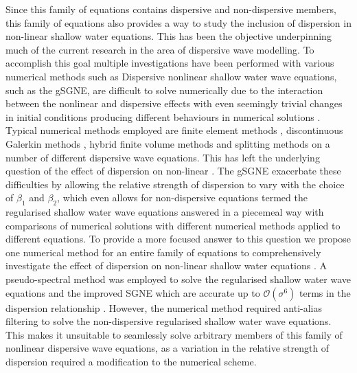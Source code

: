 \documentclass[10pt]{elsarticle}
\providecommand{\DIFaddtex}[1]{{\protect\color{blue} \sf #1}} %
\providecommand{\DIFdeltex}[1]{{\protect\color{red} \scriptsize #1}} %
\providecommand{\DIFaddbegin}{} %
\providecommand{\DIFaddend}{} %
\providecommand{\DIFdelbegin}{} %
\providecommand{\DIFdelend}{} %
\providecommand{\DIFadd}[1]{\texorpdfstring{\DIFaddtex{#1}}{#1}} %
\providecommand{\DIFdel}[1]{\texorpdfstring{\DIFdeltex{#1}}{}} %
\newcommand{\DIFscaledelfig}{0.5}
\newlength{\DIFdelgraphicswidth} %
\newlength{\DIFdelgraphicsheight} %
\newcommand{\DIFaddincludegraphics}[2][]{{\color{blue}\fbox{\DIFOincludegraphics[#1]{#2}}}} %
\newcommand{\DIFdelincludegraphics}[2][]{%
\sbox{\DIFdelgraphicsbox}{\DIFOincludegraphics[#1]{#2}}%
\settoboxwidth{\DIFdelgraphicswidth}{\DIFdelgraphicsbox} %
\settoboxtotalheight{\DIFdelgraphicsheight}{\DIFdelgraphicsbox} %
\scalebox{\DIFscaledelfig}{%
\parbox[b]{\DIFdelgraphicswidth}{\usebox{\DIFdelgraphicsbox}\\[-\baselineskip] \rule{\DIFdelgraphicswidth}{0em}}\llap{\resizebox{\DIFdelgraphicswidth}{\DIFdelgraphicsheight}{%
\setlength{\unitlength}{\DIFdelgraphicswidth}%
\begin{picture}(1,1)%
\thicklines\linethickness{2pt} %
{\color[rgb]{1,0,0}\put(0,0){\framebox(1,1){}}}%
{\color[rgb]{1,0,0}\put(0,0){\line( 1,1){1}}}%
{\color[rgb]{1,0,0}\put(0,1){\line(1,-1){1}}}%
\end{picture}%
}\hspace*{3pt}}} %
} %
\DeclareRobustCommand{\DIFaddbegin}{\DIFOaddbegin \let\includegraphics\DIFaddincludegraphics} %
\DeclareRobustCommand{\DIFaddend}{\DIFOaddend \let\includegraphics\DIFOincludegraphics} %
\DeclareRobustCommand{\DIFdelbegin}{\DIFOdelbegin \let\includegraphics\DIFdelincludegraphics} %
\DeclareRobustCommand{\DIFdelend}{\DIFOaddend \let\includegraphics\DIFOincludegraphics} %
\begin{document}
\DIFdelbegin \DIFdel{Since this family of equations contains dispersive and non-dispersive members, this family of equations also provides a way to study the inclusion of dispersion in non-linear shallow water equations. This has been the objective underpinning much of the current research in the area of dispersive wave modelling. To accomplish this goal multiple investigations have been performed with various numerical methods such as }\DIFdelend \DIFaddbegin \DIFadd{Dispersive nonlinear shallow water wave equations, such as the gSGNE, are difficult to solve numerically due to the interaction between the nonlinear and dispersive effects with even seemingly trivial changes in initial conditions producing different behaviours in numerical solutions \cite{Pitt-2018-61}. Typical numerical methods employed are }\DIFaddend finite element methods \cite{Clamond-et.al-2017-245}, discontinuous Galerkin methods \cite{DONG-2016-110,PANDA-2014-572,LI-2019-108953}, hybrid finite volume methods \cite{Hank-etal-2010-2034,Zoppou-etal-2016} and splitting methods \cite{LANNES-2015-238,Filippini-etal-2016-381,doCarmo-etal-2018-404}\DIFdelbegin \DIFdel{on a number of different dispersive wave equations. This has left the underlying question of the effect of dispersion on non-linear }\DIFdelend \DIFaddbegin \DIFadd{. The gSGNE exacerbate these difficulties by allowing the relative strength of dispersion to vary with the choice of $\beta_1$ and $\beta_2$, which even allows for non-dispersive equations termed the regularised }\DIFaddend shallow water wave equations \DIFdelbegin \DIFdel{answered in a piecemeal way with comparisons of numerical solutions with different numerical methods applied to different equations. To provide a more focused answer to this question we propose one numerical method for an entire family of equations to comprehensively investigate the effect of dispersion on non-linear shallow water equations}\DIFdelend \DIFaddbegin \DIFadd{\cite{Clamond-Dutykh-2018-237}. A pseudo-spectral method  \cite{Dutykh-etal-2013-761} was employed to solve the regularised shallow water wave equations \cite{Clamond-Dutykh-2018-237} and the improved SGNE which are accurate up to $\mathcal{O}\left(\sigma^6\right)$ terms in the dispersion relationship \cite{Clamond-et.al-2017-245}. However, the numerical method required anti-alias filtering to solve the non-dispersive regularised shallow water wave equations. This makes it unsuitable to seamlessly solve arbitrary members of this family of nonlinear dispersive wave equations, as a variation in the relative strength of dispersion required a modification to the numerical scheme}\DIFaddend .
\end{document}
